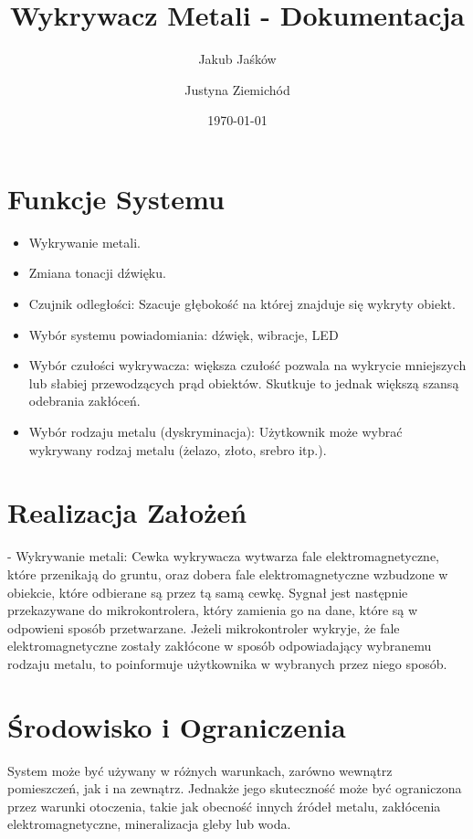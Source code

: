\documentclass{article}
\title{Wykrywacz Metali - Dokumentacja}
\author{
	Jakub Jaśków
	\and
	Justyna Ziemichód
}
\date{\today}
\begin{document}
\maketitle

\section{Funkcje Systemu}
\begin{itemize}
    \item Wykrywanie metali.
    \item Zmiana tonacji dźwięku.
    \item Czujnik odległości: Szacuje głębokość na której znajduje się wykryty obiekt.
    \item Wybór systemu powiadomiania: dźwięk, wibracje, LED
    \item Wybór czułości wykrywacza: większa czułość pozwala na wykrycie mniejszych lub słabiej przewodzących prąd obiektów. Skutkuje to jednak większą szansą odebrania zakłóceń.
    \item Wybór rodzaju metalu (dyskryminacja): Użytkownik może wybrać wykrywany rodzaj metalu (żelazo, złoto, srebro itp.).
\end{itemize}

\section{Realizacja Założeń}
	
- Wykrywanie metali: Cewka wykrywacza wytwarza fale elektromagnetyczne, które przenikają do gruntu, oraz dobera fale elektromagnetyczne wzbudzone w obiekcie, które odbierane są przez tą samą cewkę. Sygnał jest następnie przekazywane do mikrokontrolera, który zamienia go na dane, które są w odpowieni sposób przetwarzane. Jeżeli mikrokontroler wykryje, że fale elektromagnetyczne zostały zakłócone w sposób odpowiadający wybranemu rodzaju metalu, to poinformuje użytkownika w wybranych przez niego sposób.
\section{Środowisko i Ograniczenia}
System może być używany w różnych warunkach, zarówno wewnątrz pomieszczeń, jak i na zewnątrz. Jednakże jego skuteczność może być ograniczona przez warunki otoczenia, takie jak obecność innych źródeł metalu, zakłócenia elektromagnetyczne, mineralizacja gleby lub woda.
\end{document}
